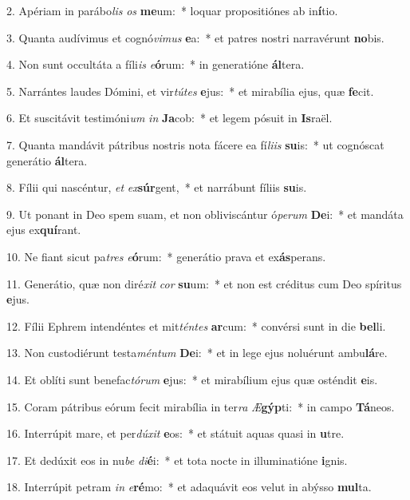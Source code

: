 2. Apériam in parábo\textit{lis} \textit{os} \textbf{me}um:~*  loquar propositiónes ab in\textbf{í}tio.\

3. Quanta audívimus et cognó\textit{vi}\textit{mus} \textbf{e}a:~*  et patres nostri narravérunt \textbf{no}bis.\

4. Non sunt occultáta a fíli\textit{is} \textit{e}\textbf{ó}rum:~*  in generatióne \textbf{ál}tera.\

5. Narrántes laudes Dómini, et vir\textit{tú}\textit{tes} \textbf{e}jus:~*  et mirabília ejus, quæ \textbf{fe}cit.\

6. Et suscitávit testimóni\textit{um} \textit{in} \textbf{Ja}cob:~*  et legem pósuit in \textbf{Is}raël.\

7. Quanta mandávit pátribus nostris nota fácere ea fí\textit{li}\textit{is} \textbf{su}is:~*  ut cognóscat generátio \textbf{ál}tera.\

8. Fílii qui nascéntur, \textit{et} \textit{ex}\textbf{súr}gent,~*  et narrábunt fíliis \textbf{su}is.\

9. Ut ponant in Deo spem suam, et non obliviscántur ó\textit{pe}\textit{rum} \textbf{De}i:~*  et mandáta ejus ex\textbf{quí}rant.\

10. Ne fiant sicut pa\textit{tres} \textit{e}\textbf{ó}rum:~*  generátio prava et ex\textbf{ás}perans.\

11. Generátio, quæ non diré\textit{xit} \textit{cor} \textbf{su}um:~*  et non est créditus cum Deo spíritus \textbf{e}jus.\

12. Fílii Ephrem intendéntes et mit\textit{tén}\textit{tes} \textbf{ar}cum:~*  convérsi sunt in die \textbf{bel}li.\

13. Non custodiérunt testa\textit{mén}\textit{tum} \textbf{De}i:~*  et in lege ejus noluérunt ambu\textbf{lá}re.\

14. Et oblíti sunt benefac\textit{tó}\textit{rum} \textbf{e}jus:~*  et mirabílium ejus quæ osténdit \textbf{e}is.\

15. Coram pátribus eórum fecit mirabília in ter\textit{ra} \textit{Æ}\textbf{gýp}ti:~*  in campo \textbf{Tá}neos.\

16. Interrúpit mare, et per\textit{dú}\textit{xit} \textbf{e}os:~*  et státuit aquas quasi in \textbf{u}tre.\

17. Et dedúxit eos in nu\textit{be} \textit{di}\textbf{é}i:~*  et tota nocte in illuminatióne \textbf{i}gnis.\

18. Interrúpit petram \textit{in} \textit{e}\textbf{ré}mo:~*  et adaquávit eos velut in abýsso \textbf{mul}ta.\

